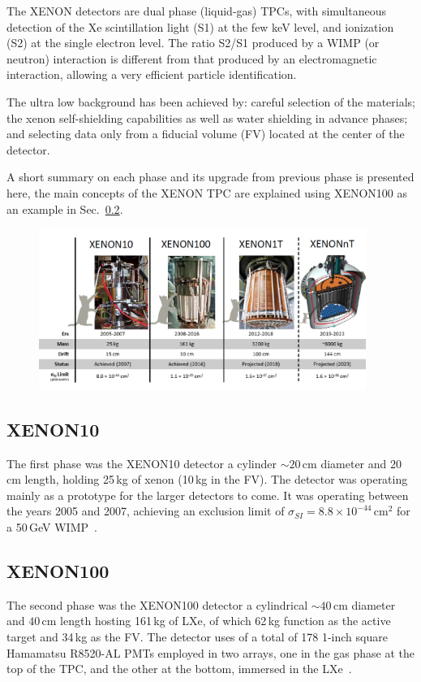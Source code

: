 The XENON detectors are dual phase (liquid-gas) TPCs, with simultaneous
detection of the Xe scintillation light (S1) at the few keV level, and ionization (S2) at the single electron level. The ratio S2/S1 produced by a WIMP (or neutron) interaction is different from that produced by an electromagnetic interaction, allowing a very efficient particle identification.

The ultra low background has been achieved by: careful selection of the materials; the xenon self-shielding capabilities as well as water shielding in advance phases; and selecting data only from a fiducial volume (FV) located at the center of the detector.

A short summary on each phase and its upgrade from previous phase is presented here, the main concepts of the XENON TPC are explained using XENON100 as an example in Sec.~\ref{sec:xe100}.


\begin{figure}[t!]
	\centering
	\includegraphics[width=0.95\textwidth]{figs/XePhases.png}
	\label{fig:XenonProg}
\end{figure}


\subsection{XENON10}
\label{sec:xe10}
The first phase was the XENON10 detector a cylinder $\sim 20$\,cm diameter and $20$\,cm length, holding 25\,kg of xenon (10\,kg in the FV). The detector was operating mainly as a prototype for the larger detectors to come. It was operating between the years 2005 and 2007, achieving an exclusion limit of $\sigma_{SI} = 8.8 \times 10^{-44}$\,cm$^2$ for a 50\,GeV WIMP~\cite{Angle:2007uj}.

\subsection{XENON100}
\label{sec:xe100}
The second phase was the XENON100 detector a cylindrical $\sim 40$\,cm diameter and $40$\,cm length hosting 161\,kg of LXe, of which 62\,kg function as the active target and 34\,kg as the FV. The detector uses of a total of 178 1-inch square Hamamatsu R8520-AL PMTs employed in two arrays, one in the gas phase at the top of the TPC, and the other at the bottom, immersed in the LXe~\cite{xe100_instr2012}.

